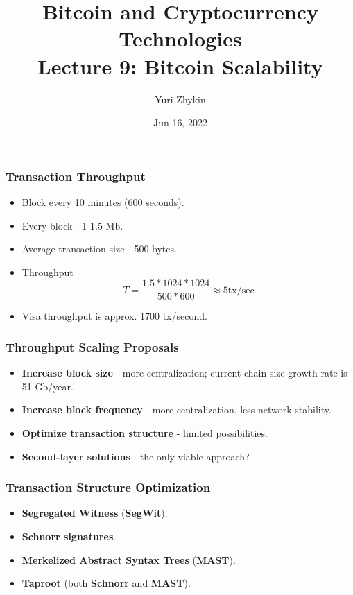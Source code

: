 \documentclass{beamer}
\title{
  Bitcoin and Cryptocurrency Technologies \\
  Lecture 9: Bitcoin Scalability
}
\author{Yuri Zhykin}
\date{Jun 16, 2022}
\begin{document}
\frame{\titlepage}

\begin{frame}
  \frametitle{Transaction Throughput}
  \begin{itemize}
  \item Block every 10 minutes (600 seconds).
  \item Every block - 1-1.5 Mb.
  \item Average transaction size - 500 bytes.
  \item Throughput
    $$T = \frac{1.5 * 1024 * 1024}{500 * 600} \approx 5 \text{tx/sec}$$
  \item Visa throughput is approx. 1700 tx/second.
  \end{itemize}
\end{frame}

\begin{frame}
  \frametitle{Throughput Scaling Proposals}
  \begin{itemize}
  \item \textbf{Increase block size} - more centralization; current chain size
    growth rate is 51 Gb/year.
  \item \textbf{Increase block frequency} - more centralization, less network
    stability.
  \item \textbf{Optimize transaction structure} - limited possibilities.
  \item \textbf{Second-layer solutions} - the only viable approach?
  \end{itemize}
\end{frame}

\begin{frame}
  \frametitle{Transaction Structure Optimization}
  \begin{itemize}
  \item \textbf{Segregated Witness} (\textbf{SegWit}).
  \item \textbf{Schnorr signatures}.
  \item \textbf{Merkelized Abstract Syntax Trees} (\textbf{MAST}).
  \item \textbf{Taproot} (both \textbf{Schnorr} and \textbf{MAST}).
  \end{itemize}
\end{frame}
\end{document}
